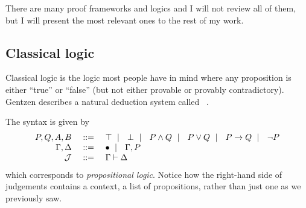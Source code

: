 There are many proof frameworks and logics and I will not review all of them,
but I will present the most relevant ones to the rest of my work.

\subsection{Classical logic}

Classical logic is the logic most people have in mind where any proposition is
either ``true'' or ``false'' (but not either provable or provably
contradictory).
Gentzen describes a natural deduction system called
\NK~.

The syntax is given by
\[
  \begin{array}{rrl}
    P, Q, A, B &\ \mathrel{{:}{:}{=}}\ & \top \ \mid\ \  \bot \ \mid\ \  P \wedge Q \ \mid\ \  P \vee Q
    \ \mid\ \  P \to Q \ \mid\ \  \neg P \\
    \Gamma, \Delta &\ \mathrel{{:}{:}{=}}\ & \bullet \ \mid\ \  \Gamma, P \\
    \mathcal{J} &\ \mathrel{{:}{:}{=}}\ & \Gamma \vdash \Delta
  \end{array}
\]
which corresponds to \emph{propositional logic}.
Notice how the right-hand side of judgements contains a context, \ie a list of
propositions, rather than just one as we previously saw.

